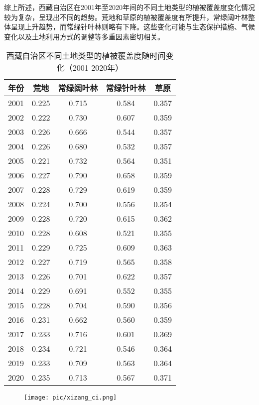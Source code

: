 \documentclass{article}
\begin{document}
				综上所述，西藏自治区在2001年至2020年间的不同土地类型的植被覆盖度变化情况较为复杂，呈现出不同的趋势。荒地和草原的植被覆盖度有所提升，常绿阔叶林整体呈现上升趋势，而常绿针叶林则略有下降。这些变化可能与生态保护措施、气候变化以及土地利用方式的调整等多重因素密切相关。
				
				
				\begin{table}[H]
					\centering
					\begin{tabular}{|c|c|c|c|c|}
						\hline
						\textbf{年份} & \textbf{荒地} & \textbf{常绿阔叶林} & \textbf{常绿针叶林} & \textbf{草原} \\
						\hline
						2001 & 0.225 & 0.715 & 0.584 & 0.357 \\
						2002 & 0.222 & 0.730 & 0.607 & 0.359 \\
						2003 & 0.226 & 0.666 & 0.544 & 0.357 \\
						2004 & 0.226 & 0.680 & 0.532 & 0.357 \\
						2005 & 0.221 & 0.732 & 0.564 & 0.351 \\
						2006 & 0.227 & 0.790 & 0.658 & 0.359 \\
						2007 & 0.228 & 0.729 & 0.619 & 0.359 \\
						2008 & 0.224 & 0.700 & 0.556 & 0.354 \\
						2009 & 0.228 & 0.720 & 0.615 & 0.362 \\
						2010 & 0.228 & 0.608 & 0.521 & 0.355 \\
						2011 & 0.229 & 0.725 & 0.609 & 0.363 \\
						2012 & 0.227 & 0.719 & 0.565 & 0.358 \\
						2013 & 0.226 & 0.701 & 0.622 & 0.357 \\
						2014 & 0.229 & 0.691 & 0.552 & 0.355 \\
						2015 & 0.228 & 0.704 & 0.590 & 0.356 \\
						2016 & 0.231 & 0.662 & 0.560 & 0.359 \\
						2017 & 0.233 & 0.716 & 0.601 & 0.369 \\
						2018 & 0.234 & 0.721 & 0.546 & 0.364 \\
						2019 & 0.233 & 0.709 & 0.563 & 0.364 \\
						2020 & 0.235 & 0.713 & 0.567 & 0.371 \\
						\hline
					\end{tabular}
					\caption{西藏自治区不同土地类型的植被覆盖度随时间变化（2001-2020年）}
				\end{table}


		\begin{figure}[H]  %
			\centering
			\texttt{[image: pic/xizang\_ci.png]} %
		\end{figure}
		
\end{document}
